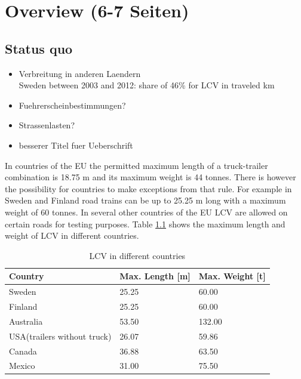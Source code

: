 \documentclass[ExampleMasters.tex]{subfiles}
\begin{document}
\clearpage
\chapter{Overview (6-7 Seiten)}
\label{chap:overview}


\section{Status quo}
\label{sec:legal_situation}

\begin{itemize}
	\item Verbreitung in anderen Laendern \\
	Sweden between 2003 and 2012: share of 46\% for LCV in traveled km \cite{balint2013correlation} 	
	\item Fuehrerscheinbestimmungen?
	\item Strassenlasten?
	\item besserer Titel fuer Ueberschrift
\end{itemize}

In countries of the EU the permitted maximum length of a truck-trailer combination is 18.75 m and its maximum weight is 44 tonnes. There is however the possibility for countries to make exceptions from that rule.\cite{96/53/EC}  For example in Sweden and Finland road trains can be up to 25.25 m long with a  maximum weight of 60 tonnes.\cite{Vaegverket}
In several other countries of the EU LCV are allowed on certain roads for testing purposes. 
Table \ref{tab:LCV_in_different_countries} shows the maximum length and weight of LCV in different countries.

\begin{table}[h]
	\centering
	\caption{LCV in different countries\cite{Vaegverket}\cite{LCV_Australia}\Cite{LCV_USA}\cite{LCV_Canada}\Cite{LCV_Mexico}}
	\label{tab:LCV_in_different_countries}
	\begin{tabular}{l|l|l|}
		Country   & Max. Length [m] & Max. Weight [t] \\ \hline
		Sweden    &       25.25      &       60.00      \\
		Finland   &            25.25 &         60.00    \\
		Australia &      53.50       &           132.00  \\
		USA(trailers without truck)&      26.07       &    59.86        \\
		Canada & 36.88 & 63.50 \\
		Mexico & 31.00 & 75.50 \\
	\end{tabular} \\
\end{table}
\end{document}
